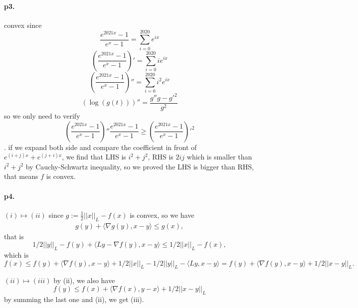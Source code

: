 \documentclass[8pt,a4paper]{article}
\begin{document}
	\paragraph{p3.}convex
	since \begin{equation*}
		\frac{e^{2021x}-1}{e^x-1}=\sum_{i=0}^{2020} e^{ix}
	\end{equation*}
	\begin{equation*}
		\left(\frac{e^{2021x}-1}{e^x-1}\right)'=\sum_{i=0}^{2020} ie^{ix}
	\end{equation*}
\begin{equation*}
	\left(\frac{e^{2021x}-1}{e^x-1}\right)''=\sum_{i=0}^{2020} i^2e^{ix}
\end{equation*}
	\begin{equation*}
		\left(\log(g(t))\right)''=\frac{g''g-g'^2}{g^2}
	\end{equation*}
	 so we only need to verify 
	 \begin{equation*}
	 	\left(\frac{e^{2021x}-1}{e^x-1}\right)''\frac{e^{2021x}-1}{e^x-1}\geq 	\left(\frac{e^{2021x}-1}{e^x-1}\right)'^2
	 \end{equation*}.
 if we expand both side and compare the coefficient in front of $e^{(i+j)x}+e^{(j+i)x}$, we find that LHS is $i^2+j^2$, RHS is $2ij$ which is smaller than $i^2+j^2$ by Cauchy-Schwartz inequality, so we proved the LHS is bigger than RHS, that means $f$ is convex.
	
	
	\paragraph{p4.}
	$(i)\mapsto (ii)$
	since $g:=\frac{1}{2}||x||_L-f(x)$ is convex, so 
	we have\begin{eqnarray*}
		g(y)+\langle\nabla g(y),x-y\rangle\leq g(x),
	\end{eqnarray*}
	that is \begin{equation*}
		1/2||y||_L-f(y)+\langle Ly-\nabla f(y),x-y\rangle\leq 1/2||x||_L-f(x),
	\end{equation*}
	which is 
	\begin{equation*}
		f(x)\leq f(y)+\langle\nabla f(y),x-y\rangle+1/2||x||_L-1/2||y||_L -\langle Ly,x-y\rangle=f(y)+\langle \nabla f(y),x-y\rangle+1/2||x-y||_L.
	\end{equation*}
	
	$(ii)\mapsto (iii)$
	by (ii), we also have 
	\begin{equation*}
		f(y)\leq f(x)+\langle\nabla f(x),y-x\rangle+1/2||x-y||_L
	\end{equation*}
	by summing the last one and (ii), we get (iii).
	
\end{document}
